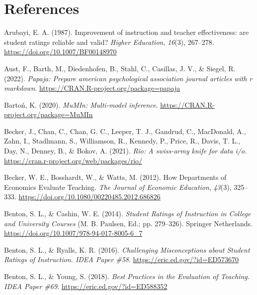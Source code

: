 \documentclass[
  man]{apa7}
\newlength{\cslhangindent}
\newlength{\cslentryspacingunit} %
\newenvironment{CSLReferences}[2] %
 {%
  \setlength{\parindent}{0pt}
  \ifodd #1
  \let\oldpar\par
  \def\par{\hangindent=\cslhangindent\oldpar}
  \fi
  \setlength{\parskip}{#2\cslentryspacingunit}
 }%
 {}
\begin{document}
\newpage

\hypertarget{references}{%
\section{References}\label{references}}

\hypertarget{refs}{}
\begin{CSLReferences}{1}{0}
\leavevmode{}%
Arubayi, E. A. (1987). Improvement of instruction and teacher effectiveness: are student ratings reliable and valid? \emph{Higher Education}, \emph{16}(3), 267--278. \url{https://doi.org/10.1007/BF00148970}

\leavevmode{}%
Aust, F., Barth, M., Diedenhofen, B., Stahl, C., Casillas, J. V., \& Siegel, R. (2022). \emph{Papaja: Prepare american psychological association journal articles with r markdown}. \url{https://CRAN.R-project.org/package=papaja}

\leavevmode{}%
Bartoń, K. (2020). \emph{MuMIn: Multi-model inference}. \url{https://CRAN.R-project.org/package=MuMIn}

\leavevmode{}%
Becker, J., Chan, C., Chan, G. C., Leeper, T. J., Gandrud, C., MacDonald, A., Zahn, I., Stadlmann, S., Williamson, R., Kennedy, P., Price, R., Davis, T. L., Day, N., Denney, B., \& Bokov, A. (2021). \emph{Rio: A swiss-army knife for data i/o}. \url{https://cran.r-project.org/web/packages/rio/}

\leavevmode{}%
Becker, W. E., Bosshardt, W., \& Watts, M. (2012). How Departments of Economics Evaluate Teaching. \emph{The Journal of Economic Education}, \emph{43}(3), 325--333. \url{https://doi.org/10.1080/00220485.2012.686826}

\leavevmode{}%
Benton, S. L., \& Cashin, W. E. (2014). \emph{Student Ratings of Instruction in College and University Courses} (M. B. Paulsen, Ed.; pp. 279--326). Springer Netherlands. \url{https://doi.org/10.1007/978-94-017-8005-6_7}

\leavevmode{}%
Benton, S. L., \& Ryalls, K. R. (2016). \emph{Challenging Misconceptions about Student Ratings of Instruction. IDEA Paper {\#}58}. \url{https://eric.ed.gov/?id=ED573670}

\leavevmode{}%
Benton, S. L., \& Young, S. (2018). \emph{Best Practices in the Evaluation of Teaching. IDEA Paper {\#}69}. \url{https://eric.ed.gov/?id=ED588352}


\end{CSLReferences}
\end{document}
